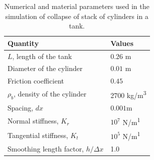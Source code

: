 \begin{table}[!ht]
  \caption{Numerical and material parameters used in the simulation of collapse
    of stack of cylinders in a tank.}%
  \label{tab:stack-of-cylinders}
  \centering
  \begin{tabular}[!ht]{ll}
    \toprule
    Quantity & Values\\
    \midrule
    $L$, length of the tank & $0.26$ m \\
    Diameter of the cylinder & $0.01$ m \\
    Friction coefficient & $0.45$ \\
    $\rho_b$, density of the cylinder & 2700 kg/m\textsuperscript{3} \\
    Spacing, $dx$ & $0.001$m\\
    Normal stiffness, $K_r$ & $10^{7}$ N/m\textsuperscript{1}\\
    Tangential stiffness, $K_t$ & $10^{5}$ N/m\textsuperscript{1}\\
    Smoothing length factor, $h/\Delta x$ & 1.0\\
    \bottomrule
  \end{tabular}
\end{table}

